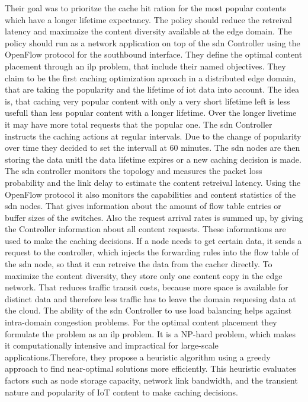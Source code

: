 \documentclass[conference]{IEEEtran}
\begin{document}
	Their goal was to prioritze the cache hit ration for the most popular contents which have a longer lifetime expectancy. The policy should reduce the retreival latency and maximaize the content diversity available at the edge domain. The policy should run as a network application on top of the \ac{sdn} Controller using the OpenFlow protocol for the southbound interface. They define the optimal content placement through an \ac{ilp} problem, that include their named objectives. They claim to be the first caching optimization aproach in a distributed edge domain, that are taking the popularity and the lifetime of \ac{iot} data into account. The idea is, that caching very popular content with only a very short lifetime left is less usefull than less popular content with a longer lifetime. Over the longer livetime it may have more total requests that the popular one.
	The \ac{sdn} Controller instructs the caching actions at regular intervals. Due to the change of popularity over time \cite{caching-5} they decided to set the intervall at 60 minutes. The \ac{sdn} nodes are then storing the data unitl the data lifetime expires or a new caching decision is made. The \ac{sdn} controller monitors the topology and measures the packet loss probability and the link delay to estimate the content retreival latency. Using the OpenFlow protocol it also monitors the capabilities and content statistics of the \ac{sdn} nodes. That gives information about the amount of flow table entries or buffer sizes of the switches. Also the request arrival rates is summed up, by giving the Controller information about all content requests. These informations are used to make the caching decisions.
	If a node needs to get certain data, it sends a request to the controller, which injects the forwarding rules into the flow table of the \ac{sdn} node, so that it can retreive the data from the cacher directly. To maximize the content diversity, they store only one content copy in the edge network. That reduces traffic transit costs, because more space is available for distinct data and therefore less traffic has to leave the domain requesing data at the cloud. The ability of the \ac{sdn} Controller to use load balancing helps against intra-domain congestion problems. 
	For the optimal content placement they formulate the problem as an \ac{ilp} problem. It is a NP-hard problem, which makes it computationally intensive and impractical for large-scale applications.Therefore, they propose a heuristic algorithm using a greedy approach to find near-optimal solutions more efficiently. This heuristic evaluates factors such as node storage capacity, network link bandwidth, and the transient nature and popularity of IoT content to make caching decisions.
\end{document}

